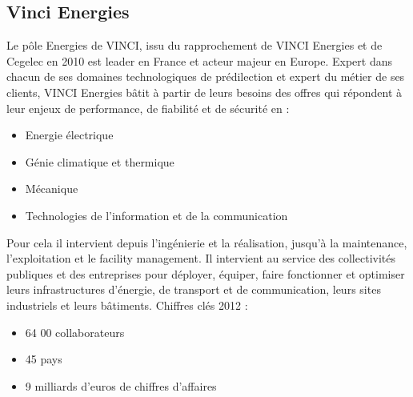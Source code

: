     \subsection{Vinci Energies}
    	Le pôle Energies de VINCI, issu du rapprochement de VINCI Energies et de Cegelec en 2010 est leader en France et acteur majeur en Europe.
    	Expert dans chacun de ses domaines technologiques de prédilection et expert du métier de ses clients, VINCI Energies bâtit à partir de leurs besoins des offres qui répondent à leur enjeux de performance, de fiabilité et de sécurité en :
    \begin{itemize}
    	\item Energie électrique
    	\item Génie climatique et thermique
    	\item Mécanique
    	\item Technologies de l'information et de la communication
    \end{itemize}
    \bigbreak
    	Pour cela il intervient depuis l'ingénierie et la réalisation, jusqu'à la maintenance, l'exploitation et le facility management. Il intervient au service des collectivités publiques et des entreprises pour déployer, équiper, faire fonctionner et optimiser leurs infrastructures d'énergie, de transport et de communication, leurs sites industriels et leurs bâtiments.
    \newpage
    Chiffres clés 2012 :
    \begin{itemize}
    	\item 64 00 collaborateurs
    	\item 45 pays
    	\item 9 milliards d'euros de chiffres d'affaires
    \end{itemize}

